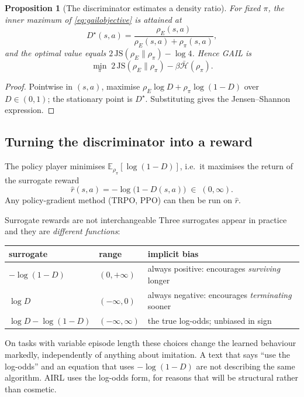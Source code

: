\documentclass[11pt]{article}
\theoremstyle{plain}
\newtheorem{proposition}[theorem]{Proposition}
\theoremstyle{definition}
\theoremstyle{remark}
\newcommand{\E}{\mathbb{E}}
\newcommand{\JS}{\mathrm{JS}}
\begin{document}
\begin{proposition}[The discriminator estimates a density
ratio]\label{prop:gaildratio}
For fixed $\pi$, the inner maximum of \eqref{eq:gailobjective} is attained
at
\begin{equation}
D^\star(s,a) = \frac{\rho_E(s,a)}{\rho_E(s,a)+\rho_\pi(s,a)},
\label{eq:gaildstar}
\end{equation}
and the optimal value equals $2\,\JS(\rho_E\|\rho_\pi) - \log4$. Hence
GAIL is
\begin{equation}
\min_\pi \; 2\,\JS(\rho_E\|\rho_\pi) - \beta\bar{\mathcal{H}}(\rho_\pi).
\label{eq:gailjs}
\end{equation}
\end{proposition}

\begin{proof}
Pointwise in $(s,a)$, maximise $\rho_E\log D + \rho_\pi\log(1-D)$ over
$D\in(0,1)$; the stationary point is $D^\star$. Substituting gives the
Jensen--Shannon expression.
\end{proof}

\subsection{Turning the discriminator into a reward}

The policy player minimises $\E_{\rho_\pi}[\log(1-D)]$, i.e.\ it maximises
the return of the surrogate reward
\begin{equation}
\hat r(s,a) = -\log\big(1-D(s,a)\big) \;\in\; (0,\infty).
\label{eq:gailreward}
\end{equation}
Any policy-gradient method (TRPO, PPO) can then be run on $\hat r$.

\begin{redbox}{Surrogate rewards are not interchangeable}
Three surrogates appear in practice and they are \emph{different
functions}:
\begin{center}
\begin{tabular}{@{}lll@{}}
\toprule
\textbf{surrogate} & \textbf{range} & \textbf{implicit bias}\\
\midrule
$-\log(1-D)$ & $(0,+\infty)$ & always positive: encourages
\emph{surviving} longer\\
$\log D$ & $(-\infty,0)$ & always negative: encourages \emph{terminating}
sooner\\
$\log D - \log(1-D)$ & $(-\infty,\infty)$ & the true log-odds; unbiased in
sign\\
\bottomrule
\end{tabular}
\end{center}
On tasks with variable episode length these choices change the learned
behaviour markedly, independently of anything about imitation. A text that
says ``use the log-odds'' and an equation that uses $-\log(1-D)$ are not
describing the same algorithm. AIRL uses the log-odds form, for reasons
that will be structural rather than cosmetic.
\end{redbox}
\end{document}
